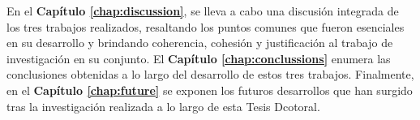 En el \textbf{Capítulo \ref{chap:discussion}}, se lleva a cabo una discusión integrada de los tres trabajos realizados, resaltando los puntos comunes que fueron esenciales en su desarrollo y brindando coherencia, cohesión y justificación al trabajo de investigación en su conjunto. El \textbf{Capítulo \ref{chap:conclussions}} enumera las conclusiones obtenidas a lo largo del desarrollo de estos tres trabajos. Finalmente, en el \textbf{Capítulo \ref{chap:future}} se exponen los futuros desarrollos que han surgido tras la investigación realizada a lo largo de esta Tesis Dcotoral.

